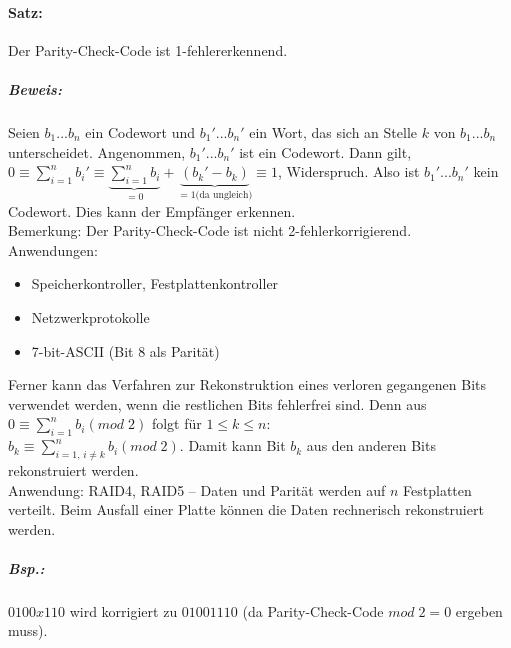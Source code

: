 \paragraph{Satz:} Der Parity-Check-Code ist 1-fehlererkennend.
\subparagraph{Beweis:} Seien $b_1...b_n$ ein Codewort und $b_1'...b_n'$ ein Wort, das sich an Stelle $k$ von $b_1...b_n$ unterscheidet. Angenommen, $b_1'...b_n'$ ist ein Codewort. Dann gilt, $0\equiv \sum_{i=1}^{n}b_i'\equiv \underbrace{\sum_{i=1}^{n}b_i}_{=0}+\underbrace{(b_k'-b_k)}_{=1 \text{(da ungleich)}}\equiv 1$, Widerspruch. Also ist $b_1'...b_n'$ kein Codewort. Dies kann der Empfänger erkennen.\\
Bemerkung: Der Parity-Check-Code ist nicht 2-fehlerkorrigierend.\\
Anwendungen: 
\begin{itemize}
\item Speicherkontroller, Festplattenkontroller
\item Netzwerkprotokolle
\item 7-bit-ASCII (Bit 8 als Parität)
\end{itemize}
Ferner kann das Verfahren zur Rekonstruktion eines verloren gegangenen Bits verwendet werden, wenn die restlichen Bits fehlerfrei sind. Denn aus $0\equiv \sum_{i=1}^{n} b_i (mod\;2)$ folgt für $1\leq k \leq n$: \\
$b_k\equiv \sum_{i=1,\, i\not =k}^{n} b_i (mod\;2)$. Damit kann Bit $b_k$ aus den anderen Bits rekonstruiert werden.\\
Anwendung: RAID4, RAID5 -- Daten und Parität werden auf $n$ Festplatten verteilt. Beim Ausfall einer Platte können die Daten rechnerisch rekonstruiert werden.\\
\subparagraph{Bsp.:} $0100x110$ wird korrigiert zu $01001110$ (da Parity-Check-Code $mod\;2=0$ ergeben muss).

